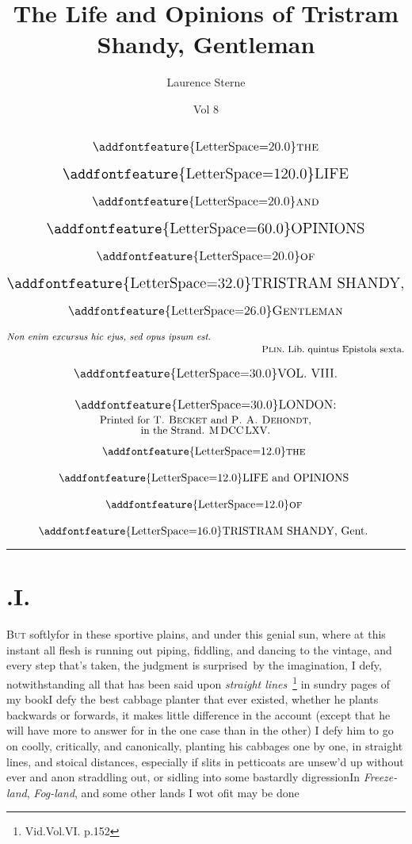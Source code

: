 \documentclass{article}
\title{The Life and Opinions of Tristram Shandy, Gentleman}
\author{Laurence Sterne}
\date{Vol 8}
\begin{document}
\pagestyle{empty}
\enlargethispage{72pt}
\[\vbox{\openup 12pt\halign{#\cr
\noalign{\vskip -20pt}
\hss\large{\addfontfeature{LetterSpace=20.0}\textsc{the}}\hss\cr
\hss\Large{\addfontfeature{LetterSpace=120.0}LIFE}\hss\cr
\hss\large{\addfontfeature{LetterSpace=20.0}\textsc{and}}\hss\cr
\hss\Large{\addfontfeature{LetterSpace=60.0}OPINIONS}\hss\cr
\hss\large{\addfontfeature{LetterSpace=20.0}\textsc{of}}\hss\cr
\hss\Large{\addfontfeature{LetterSpace=32.0}TRISTRAM SHANDY},\hss\cr
\hss\large{\addfontfeature{LetterSpace=26.0}\textsc{Gentleman}}\hss\cr
\small\textit{Non enim excursus hic ejus, sed opus ipsum est}.\hss\cr
\noalign{\vskip -12pt}
\hss\small\textsc{Plin}.\@ Lib.\@ quintus Epistola sexta.\cr
\hss\large{\addfontfeature{LetterSpace=30.0}VOL}. VIII.\hss\cr
\noalign{\vskip 6pt}
\hss\large{\addfontfeature{LetterSpace=30.0}LONDON}:\hss\cr
\noalign{\vskip -10pt}
\hss Printed for \textsc{T.\@ Becket} and \textsc{P.\@ A.\@ Dehondt},\hss\cr
\noalign{\vskip -14pt}
\hss in the Strand. M\,DCC\,LXV.\hss\cr
}}\]

\newpage\null
\cleardoublepage
\setcounter{page}{1}
\pagestyle{fancy}
\thispagestyle{empty}
\hbox{}\vskip -36pt

\[\vbox{\openup 12pt\halign{\hss # \hss\cr
{\addfontfeature{LetterSpace=12.0}\textsc{the}}\cr
{\addfontfeature{LetterSpace=12.0}LIFE and OPINIONS}\cr
{\addfontfeature{LetterSpace=12.0}\textsc{of}}\cr
{\addfontfeature{LetterSpace=16.0}TRISTRAM SHANDY}, Gent.\cr}}\]

\vskip 12pt
\hrule
\sloppy
\setlength{\baselineskip}{14pt}

\section{.\enspace I.}

\lettrine{\Tsk B}{ut} softly\tsk for in these sportive plains,
and under this genial sun, where at this instant all flesh is
running out piping, fiddling, and dancing to the vintage, and
every step that’s taken, the judgment is surprised~by the
imagination, I defy, notwithstanding\pb 
all that has been said upon \textit{straight
lines}~\footnote{Vid.\@ Vol.\@ VI. p.\@ 152} in sundry pages of
my book\tsk I defy the best cabbage planter that ever existed,
whether he plants backwards or forwards, it makes little
difference in the account (except that he will have more to
answer for in the one case than in the other)\tsk
I defy him to go on coolly, critically, and canonically,
planting his cabbages one by one, in straight lines, and stoical
distances, especially if slits in petticoats are unsew’d up\tsk
without ever and anon straddling out, or sidling into some
bastardly digression\tsh In \textit{Freeze-land},
\textit{Fog-land}, and some other lands I wot of\tsk it may be done\tsh
\end{document}
